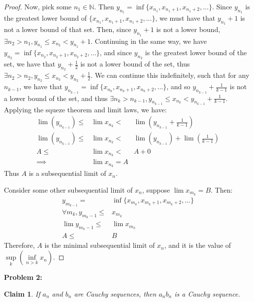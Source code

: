 \documentclass{article}
\newcommand{\nats}{\ensuremath{\mathbb{N}}}
\newtheorem{clm}{Claim}
\begin{document}
\begin{proof}
	Now, pick some $n_1 \in \nats$.
	Then $y_{n_1} = \inf \{ x_{n_1}, x_{n_1 + 1}, x_{n_1 + 2}, ...\}$.
	Since $y_{n_1}$ is the greatest lower bound of
	$\{ x_{n_1}, x_{n_1 + 1}, x_{n_1 + 2}, ...\}$,
	we must have that $y_{n_1} + 1$ is not a lower bound of that set.
	Then, since $y_{n_1} + 1$ is not a lower bound,
	$\exists n_2 > n_1, y_{n_1} \le x_{n_2} < y_{n_1} + 1$.
	Continuing in the same way,
	we have $y_{n_2} = \inf \{ x_{n_2}, x_{n_2 + 1}, x_{n_2 + 2}, ...\}$,
	and since $y_{n_2}$ is the greatest lower bound of the set,
	we have that $y_{n_2} + \frac{1}{2}$ is not a lower bound of the set,
	thus $\exists n_2 > n_2, y_{n_2} \le x_{n_3} < y_{n_2} + \frac{1}{2}$.
	We can continue this indefinitely,
	such that for any $n_{k - 1}$,
	we have that $y_{n_{k - 1}} = \inf \{ x_{n_k}, x_{n_k + 1}, x_{n_k + 2}, ... \}$,
	and so $y_{n_{k - 1}} + \frac{1}{k - 1}$ is not a lower bound of the set,
	and thus $\exists n_k > n_{k - 1}, y_{n_{k - 1}} \le x_{n_k} < y_{n_{k - 1}} + \frac{1}{k - 1}$.
	Applying the squeze theorem and limit laws, we have:
	\begin{align}
		\lim (y_{n_{k - 1}}) \le & \lim x_{n_k} < & \lim (y_{n_{k - 1}} + \frac{1}{k - 1}) \\
		\lim (y_{n_{k - 1}}) \le & \lim x_{n_k} < & \lim (y_{n_{k - 1}}) + \lim(\frac{1}{k - 1}) \\
		A \le & \lim x_{n_k} < & A + 0 \\
		\implies & \lim x_{n_k} = A
	\end{align}
	Thus $A$ is a subsequential limit of $x_n$.

	Consider some other subsequential limit of $x_n$,
	suppose $\lim x_{m_k} = B$.
	Then:
	\begin{align}
		y_{m_{k - 1}} = & \inf \{ x_{m_k}, x_{m_k + 1}, x_{m_k + 2}, ... \} \\
		\forall m_k, y_{m_k - 1} \le & x_{m_k} \\
		\lim y_{m_k - 1} \le & \lim x_{m_k} \\
		A \le & B 
	\end{align}
	Therefore, $A$ is the minimal subsequential limit of $x_n$,
	and it is the value of
	$\underset{k}{\sup}(\underset{n > k}{\inf} x_n)$.
\end{proof}

\textbf{Problem 2:}

\begin{clm}
	If $a_n$ and $b_n$ are Cauchy sequences,
	then $a_n b_n$ is a Cauchy sequence.
\end{clm}
\end{document}
